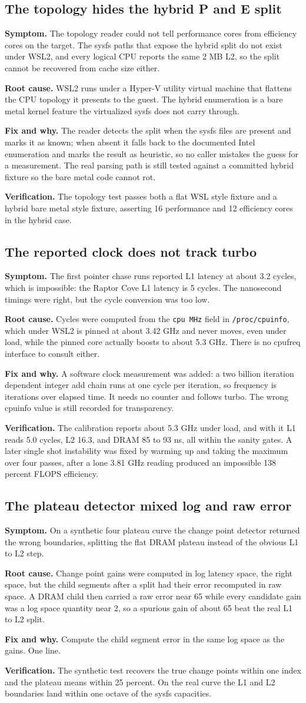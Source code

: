 \documentclass[11pt,a4paper]{article}
\newcommand{\entry}[5]{%
  \subsection*{#1}%
  \noindent\textbf{Symptom.} #2\par\smallskip
  \noindent\textbf{Root cause.} #3\par\smallskip
  \noindent\textbf{Fix and why.} #4\par\smallskip
  \noindent\textbf{Verification.} #5\par\bigskip
}
\begin{document}
\entry{The topology hides the hybrid P and E split}
{The topology reader could not tell performance cores from efficiency cores on
the target. The sysfs paths that expose the hybrid split do not exist under
WSL2, and every logical CPU reports the same 2 MB L2, so the split cannot be
recovered from cache size either.}
{WSL2 runs under a Hyper-V utility virtual machine that flattens the CPU
topology it presents to the guest. The hybrid enumeration is a bare metal kernel
feature the virtualized sysfs does not carry through.}
{The reader detects the split when the sysfs files are present and marks it as
known; when absent it falls back to the documented Intel enumeration and marks
the result as heuristic, so no caller mistakes the guess for a measurement. The
real parsing path is still tested against a committed hybrid fixture so the bare
metal code cannot rot.}
{The topology test passes both a flat WSL style fixture and a hybrid bare metal
style fixture, asserting 16 performance and 12 efficiency cores in the hybrid
case.}

\entry{The reported clock does not track turbo}
{The first pointer chase runs reported L1 latency at about 3.2 cycles, which is
impossible: the Raptor Cove L1 latency is 5 cycles. The nanosecond timings were
right, but the cycle conversion was too low.}
{Cycles were computed from the \texttt{cpu MHz} field in
\texttt{/proc/cpuinfo}, which under WSL2 is pinned at about 3.42 GHz and never
moves, even under load, while the pinned core actually boosts to about 5.3 GHz.
There is no cpufreq interface to consult either.}
{A software clock measurement was added: a two billion iteration dependent
integer add chain runs at one cycle per iteration, so frequency is iterations
over elapsed time. It needs no counter and follows turbo. The wrong cpuinfo
value is still recorded for transparency.}
{The calibration reports about 5.3 GHz under load, and with it L1 reads 5.0
cycles, L2 16.3, and DRAM 85 to 93 ns, all within the sanity gates. A later
single shot instability was fixed by warming up and taking the maximum over four
passes, after a lone 3.81 GHz reading produced an impossible 138 percent FLOPS
efficiency.}

\entry{The plateau detector mixed log and raw error}
{On a synthetic four plateau curve the change point detector returned the wrong
boundaries, splitting the flat DRAM plateau instead of the obvious L1 to L2
step.}
{Change point gains were computed in log latency space, the right space, but the
child segments after a split had their error recomputed in raw space. A DRAM
child then carried a raw error near 65 while every candidate gain was a log space
quantity near 2, so a spurious gain of about 65 beat the real L1 to L2 split.}
{Compute the child segment error in the same log space as the gains. One line.}
{The synthetic test recovers the true change points within one index and the
plateau means within 25 percent. On the real curve the L1 and L2 boundaries land
within one octave of the sysfs capacities.}
\end{document}
